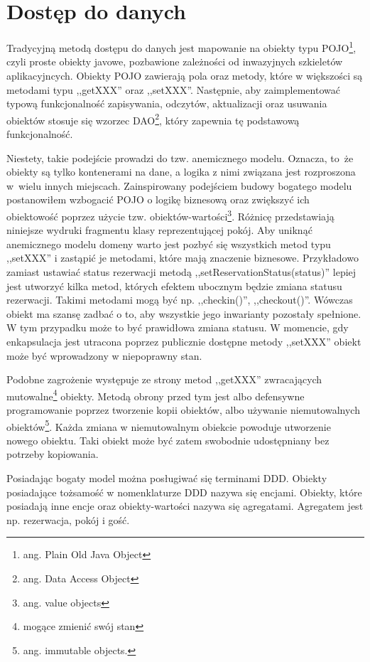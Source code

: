\documentclass[a4paper,onecolumn,oneside,11pt,wide,floatssmall]{mwrep}
\theoremstyle{definition}
\theoremstyle{plain}%
\theoremstyle{remark}
\begin{document}
\section{Dostęp do danych}
Tradycyjną metodą dostępu do danych jest mapowanie na obiekty typu POJO\footnote{ang. Plain Old Java Object}, czyli proste obiekty javowe, pozbawione zależności od inwazyjnych szkieletów aplikacyjncych. Obiekty POJO zawierają pola oraz metody, które w większości są metodami typu ,,getXXX'' oraz ,,setXXX''. Następnie, aby zaimplementować typową funkcjonalność zapisywania, odczytów, aktualizacji oraz usuwania obiektów stosuje się wzorzec DAO\footnote{ang. Data Access Object}, który zapewnia tę podstawową funkcjonalność.

Niestety, takie podejście prowadzi do tzw. anemicznego modelu. Oznacza, \mbox{to że} obiekty są tylko kontenerami na dane, a logika z nimi związana jest rozproszona \mbox{w wielu} innych miejscach. Zainspirowany podejściem budowy bogatego modelu \cite{evans2004domain} postanowiłem wzbogacić POJO o logikę biznesową oraz zwiększyć ich obiektowość poprzez użycie tzw. obiektów-wartości\footnote{ang. value objects}. Różnicę przedstawiają niniejsze wydruki fragmentu klasy reprezentującej pokój. Aby uniknąć anemicznego modelu domeny warto jest pozbyć się wszystkich metod typu ,,setXXX'' i zastąpić je metodami, które mają znaczenie biznesowe. Przykładowo zamiast ustawiać status rezerwacji metodą ,,setReservationStatus(status)'' lepiej jest utworzyć kilka metod, których efektem ubocznym będzie zmiana statusu rezerwacji. Takimi metodami mogą być np. ,,checkin()'', ,,checkout()''. Wówczas obiekt ma szansę zadbać o to, aby wszystkie jego inwarianty pozostały spełnione. W tym przypadku może to być prawidłowa zmiana statusu. W momencie, gdy enkapsulacja jest utracona poprzez publicznie dostępne metody ,,setXXX'' obiekt może być wprowadzony w niepoprawny stan.

Podobne zagrożenie występuje ze strony metod ,,getXXX'' zwracających mutowalne\footnote{mogące zmienić swój stan} obiekty. Metodą obrony przed tym jest albo defensywne programowanie poprzez tworzenie kopii obiektów, albo używanie niemutowalnych obiektów\footnote{ang. immutable objects.}. Każda zmiana w niemutowalnym obiekcie powoduje utworzenie nowego obiektu. Taki obiekt może być zatem swobodnie udostępniany bez potrzeby kopiowania.

Posiadając bogaty model można posługiwać się terminami DDD. Obiekty posiadające tożsamość w nomenklaturze DDD nazywa się encjami. Obiekty, które posiadają inne encje oraz obiekty-wartości nazywa się agregatami. Agregatem jest np. rezerwacja, pokój i gość.
\end{document}
